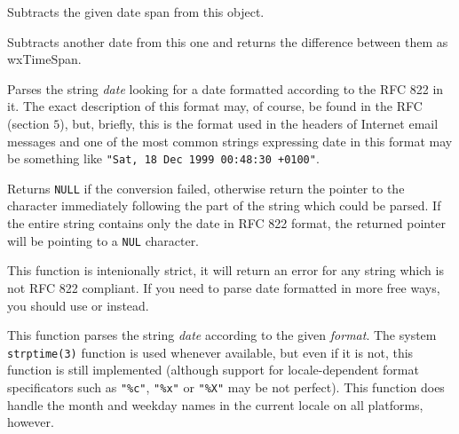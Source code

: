 


Subtracts the given date span from this object.

\label{wxdatetimesubtractdt}


Subtracts another date from this one and returns the difference between them
as wxTimeSpan.


\label{wxdatetimeparserfc822date}


Parses the string {\it date} looking for a date formatted according to the RFC
822 in it. The exact description of this format may, of course, be found in
the RFC (section $5$), but, briefly, this is the format used in the headers of
Internet email messages and one of the most common strings expressing date in
this format may be something like {\tt "Sat, 18 Dec 1999 00:48:30 +0100"}.

Returns {\tt NULL} if the conversion failed, otherwise return the pointer to
the character immediately following the part of the string which could be
parsed. If the entire string contains only the date in RFC 822 format,
the returned pointer will be pointing to a {\tt NUL} character.

This function is intenionally strict, it will return an error for any string
which is not RFC 822 compliant. If you need to parse date formatted in more
free ways, you should use  or 
 instead.

\label{wxdatetimeparseformat}


This function parses the string {\it date} according to the given 
{\it format}. The system {\tt strptime(3)} function is used whenever available,
but even if it is not, this function is still implemented (although support
for locale-dependent format specificators such as {\tt "\%c"}, {\tt "\%x"} or 
{\tt "\%X"} may be not perfect). This function does handle the month and
weekday names in the current locale on all platforms, however.

